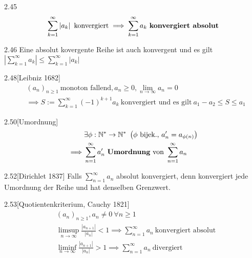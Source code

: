 \documentclass[8pt,a4paper,twocolumn,table]{extarticle}
\newcommand{\N}{\mathbb{N}}
\newcommand{\seq}[1]{\left( #1_n \right)_{n \ge 1}}
\begin{document}
\begin{definition}{2.45}
    \[ \sum_{k=1}^\infty \left| a_k \right|\ \mbox{konvergiert} \implies  \sum_{k=1}^\infty a_k\ \mbox{\textbf{konvergiert absolut}} \]
\end{definition}

\begin{satz}{2.46}
    Eine absolut kovergente Reihe ist auch konvergent und es gilt $\left| \sum_{k=1}^\infty a_k \right| \le \sum_{k=1}^\infty \left| a_k \right|$
\end{satz}

\begin{satz}{2.48}[Leibniz 1682]
    \begin{align*}
         & \seq{a}\ \mbox{monoton fallend}, a_n \ge 0, \lim_{n \to \infty} a_n = 0                                  \\
         & \implies S := \sum_{k=1}^\infty (-1)^{k+1} a_k \ \mbox{konvergiert und es gilt}\ a_1 - a_2 \le S \le a_1
    \end{align*}
\end{satz}

\begin{definition}{2.50}[Umordnung]
    \begin{align*}
         & \exists \phi: \N^* \to \N^*\ \left( \phi\ \mbox{bijek.,}\ a'_n = a_{\phi(n)} \right) \\
        \implies
         & \sum_{n=1}^\infty a'_n\ \mbox{\textbf{Umordnung} von}\ \sum_{n=1}^\infty a_n
    \end{align*}
\end{definition}

\begin{satz}{2.52}[Dirichlet 1837]
    Falls $\sum_{n=1}^\infty a_n$ absolut konvergiert, denn konvergiert jede Umordnung der Reihe und hat denselben Grenzwert.
\end{satz}

\begin{satz}{2.53}[Quotientenkriterium, Cauchy 1821]
    \begin{align*}
         & \seq{a}, a_n \ne 0\ \forall n \ge 1                                                                           \\
         & \limsup_{n \to \infty} \frac{|a_{n+1}|}{|a_n|} < 1 \implies \sum_{n=1}^\infty a_n\ \mbox{konvergiert absolut} \\
         & \liminf_{n \to \infty} \frac{|a_{n+1}|}{|a_n|} > 1 \implies \sum_{n=1}^\infty a_n\ \mbox{divergiert}
    \end{align*}
\end{satz}
\end{document}
